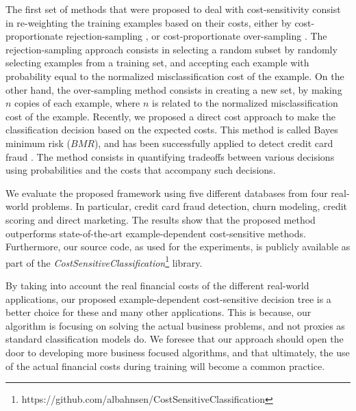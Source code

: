   The first set of methods that were proposed to deal with cost-sensitivity consist in 
  re-weighting the training examples based on their costs, either by cost-proportionate 
  rejection-sampling \citep{Zadrozny2003}, or cost-proportionate over-sampling \citep{Elkan2001}.
  The rejection-sampling approach consists in selecting a random subset by randomly 
  selecting examples from a training set, and accepting each example with probability equal to 
  the normalized misclassification cost of the example. On the other hand, the over-sampling 
  method consists in creating a new set, by making $n$ copies of each example, where $n$ is related 
  to the normalized misclassification cost of the example.
  Recently, we proposed a direct cost approach to make the classification decision based on   the  
  expected costs. This method is called Bayes minimum risk ($BMR$), and has been successfully   
  applied to detect credit card fraud \citep{CorreaBahnsen2013,CorreaBahnsen2014}. The method   
  consists in quantifying tradeoffs between various decisions using probabilities and the costs   
  that accompany such decisions. 

  We evaluate the 
  proposed framework using five different databases from four real-world problems. In particular,
  credit card fraud detection, churn modeling, credit scoring and direct marketing. The 
  results show that the proposed method outperforms state-of-the-art  example-dependent   
  cost-sensitive methods. Furthermore, our source code, as used for the experiments, is publicly 
  available as part of the \textit{CostSensitiveClassification}\footnote{
  https://github.com/albahnsen/CostSensitiveClassification} library.
  
  By taking into account the real financial costs of the different real-world applications, our 
  proposed example-dependent cost-sensitive decision tree is a better choice for these and many 
  other applications. This is because, our algorithm is focusing on solving the actual 
  business problems,  and not proxies as standard classification models do. We foresee that 
  our approach should open the door to developing more business focused algorithms, and 
  that ultimately, the use of the actual financial costs during training will become a common 
  practice.


